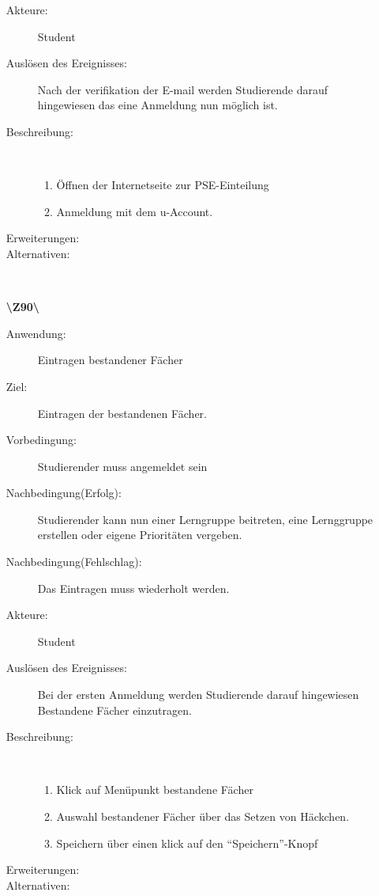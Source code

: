 \documentclass[a4paper]{article}
\begin{document}
\begin{enumerate}
\begin{description}
    \item[Akteure:] Student
    \item[Auslösen des Ereignisses:]Nach der verifikation der E-mail werden
    Studierende darauf hingewiesen das eine Anmeldung nun möglich ist.
    \item[Beschreibung:]~
    \begin{enumerate}[1.]
      \item Öffnen der Internetseite zur PSE-Einteilung
      \item Anmeldung mit dem u-Account.
      
      
    \end{enumerate}
    \item[Erweiterungen:]
    \item[Alternativen:]~
      \end{description}
  \pagebreak
  
    \item[\textbf{\textbackslash Z90\textbackslash}] \begin{description}
    \item[Anwendung:] Eintragen bestandener Fächer
    \item[Ziel:] Eintragen der bestandenen Fächer.
    \item[Vorbedingung:] Studierender muss angemeldet sein
    \item[Nachbedingung(Erfolg):] Studierender kann nun einer Lerngruppe
    beitreten, eine Lernggruppe erstellen oder eigene Prioritäten vergeben.
    \item[Nachbedingung(Fehlschlag):] Das Eintragen muss wiederholt werden.
    
    \item[Akteure:] Student
    \item[Auslösen des Ereignisses:]Bei der ersten Anmeldung werden Studierende
    darauf hingewiesen Bestandene Fächer einzutragen.
    \item[Beschreibung:]~
    \begin{enumerate}[1.]
      \item Klick auf Menüpunkt bestandene Fächer
      \item Auswahl bestandener Fächer über das Setzen von Häckchen.
      \item Speichern über einen klick auf den "`Speichern"'-Knopf
      
    \end{enumerate}
    \item[Erweiterungen:]
    \item[Alternativen:]~
      \end{description}
  \pagebreak
  

\end{enumerate}
\end{document}

